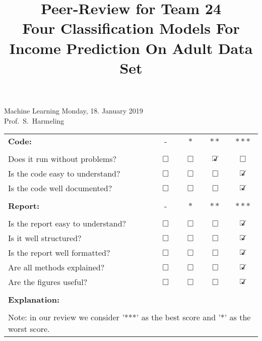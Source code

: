 \documentclass{handout}
\newcommand{\teamnumber}{24}
\newcommand{\projecttitle}{Four Classification Models For Income Prediction On
Adult Data Set}
\newcommand{\checkedbox}{$\checkmark\hspace{-.38cm}\Box$}
\newcommand{\uncheckedbox}{$\Box$}
\begin{document}
\title{Peer-Review for Team \teamnumber \\ \projecttitle}
\newpage
Machine Learning            \hfill                 Monday, 18. January 2019\\
Prof.~S.~Harmeling          \hfill     
\maketitle

\vspace{0.5cm}

\begin{tabular}{p{12.5cm}cccc}
	
	\textbf{Code:} &- & $\ast$&$\ast\ast$&$\ast\ast\ast$\\
	\vspace{0.5cm}\\
	Does it run without problems? & \uncheckedbox & \uncheckedbox & \checkedbox & \uncheckedbox\\
	Is the code easy to understand? & \uncheckedbox & \uncheckedbox & \uncheckedbox & \checkedbox\\
	Is the code well documented? & \uncheckedbox & \uncheckedbox & \uncheckedbox & \checkedbox\\
	\vspace{0.5cm}\\
	
	\textbf{Report:}  &- & $\ast$&$\ast\ast$&$\ast\ast\ast$\\
	\vspace{0.5cm}\\
	Is the report easy to understand? & \uncheckedbox & \uncheckedbox & \uncheckedbox & \checkedbox\\
	Is it well structured? & \uncheckedbox & \uncheckedbox & \uncheckedbox & \checkedbox\\
	Is the report well formatted? & \uncheckedbox & \uncheckedbox & \uncheckedbox & \checkedbox\\
	Are all methods explained? & \uncheckedbox & \uncheckedbox & \uncheckedbox & \checkedbox\\
	Are the figures useful? & \uncheckedbox & \uncheckedbox & \uncheckedbox & \checkedbox\\
	\vspace{0.5cm}\\
	
	\textbf{Explanation:}\\
	\vspace{0.5cm}\\
	\multicolumn{5}{p{16cm}}{
		Note: in our review we consider '***' as the best score and '*' as the worst score.
		
}
\end{tabular}
\end{document}
